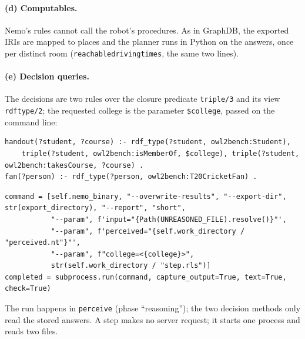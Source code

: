 \documentclass[10pt]{article}
\newcommand{\brkunderscore}{\textunderscore\allowbreak}
\newcommand{\code}[1]{{\let\_\brkunderscore\texttt{#1}}}
\begin{document}
\paragraph{(d) Computables.} Nemo's rules cannot call the robot's procedures. As in GraphDB, the exported IRIs are
mapped to places and the planner runs in Python on the answers, once per distinct room
(\code{\_reachable\_driving\_times}, the same two lines).

\paragraph{(e) Decision queries.} The decisions are two rules over the closure predicate \code{triple/3} and its view
\code{rdf\_type/2}; the requested college is the parameter \code{\$college}, passed on the command line:
\begin{lstlisting}[style=nm]
handout(?student, ?course) :- rdf_type(?student, owl2bench:Student),
    triple(?student, owl2bench:isMemberOf, $college), triple(?student, owl2bench:takesCourse, ?course) .
fan(?person) :- rdf_type(?person, owl2bench:T20CricketFan) .
\end{lstlisting}
\begin{lstlisting}[style=py]
command = [self.nemo_binary, "--overwrite-results", "--export-dir", str(export_directory), "--report", "short",
           "--param", f'input="{Path(UNREASONED_FILE).resolve()}"',
           "--param", f'perceived="{self.work_directory / "perceived.nt"}"',
           "--param", f"college=<{college}>",
           str(self.work_directory / "step.rls")]
completed = subprocess.run(command, capture_output=True, text=True, check=True)
\end{lstlisting}
The run happens in \code{perceive} (phase ``reasoning''); the two decision methods only read the stored answers. A step
makes no server request; it starts one process and reads two files.
\end{document}
